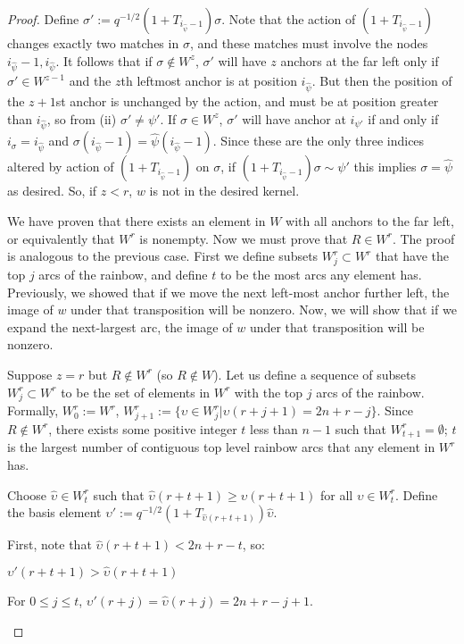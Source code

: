 \documentclass{amsart}
\begin{document}
\begin{proof}
	Define $\sigma':=q^{-1/2}(1+T_{i_{\widehat{\psi}}-1})\sigma$. Note that the action of $(1+T_{i_{\widehat{\psi}}-1})$ changes exactly two matches in $\sigma$, and these matches must involve the nodes $i_{\widehat{\psi}}-1,i_{\widehat{\psi}}$. It follows that if $\sigma\not\in W^z$, $\sigma'$ will have $z$ anchors at the far left only if $\sigma'\in W^{z-1}$ and the $z$th leftmost anchor is at position $i_{\widehat{\psi}}$. But then the position of the $z+1$st anchor is unchanged by the action, and must be at position greater than $i_{\widehat{\psi}}$, so from (ii) $\sigma'\not=\psi'$. If $\sigma\in W^z$, $\sigma'$ will have anchor at $i_{\psi'}$ if and only if $i_\sigma=i_{\widehat{\psi}}$ and $\sigma(i_{\widehat{\psi}}-1)=\widehat{\psi}(i_{\widehat{\psi}}-1)$. Since these are the only three indices altered by action of $(1+T_{i_{\widehat{\psi}}-1})$ on $\sigma$, if $(1+T_{i_{\widehat{\psi}}-1})\sigma\sim \psi'$ this implies $\sigma=\widehat{\psi}$ as desired. So, if $z<r$, $w$ is not in the desired kernel.
	
	\vspace{2mm}
	We have proven that there exists an element in $W$ with all anchors to the far left, or equivalently that $W^r$ is nonempty. Now we must prove that $R\in W^r$. The proof is analogous to the previous case. First we define subsets $W^r_j\subset W^r$ that have the top $j$ arcs of the rainbow, and define $t$ to be the most arcs any element has. Previously, we showed that if we move the next left-most anchor further left, the image of $w$ under that transposition will be nonzero. Now, we will show that if we expand the next-largest arc, the image of $w$ under that transposition will be nonzero.
	
	\vspace{2mm}
	Suppose $z=r$ but $R\not\in W^r$ (so $R\not\in W$). Let us define a sequence of subsets $W^r_j\subset W^r$ to be the set of elements in $W^r$ with the top $j$ arcs of the rainbow. Formally, $W^r_0:=W^r$, $W^r_{j+1}:=\{\upsilon\in W^r_j| \upsilon(r+j+1)=2n+r-j \}$. Since $R\not\in W^r$,  there exists some positive integer $t$ less than $n-1$ such that $W^r_{t+1}=\emptyset$; $t$ is the largest number of contiguous top level rainbow arcs that any element in $W^r$ has. 
	
	
	Choose $\widehat{\upsilon}\in W^r_t$ such that $\widehat{\upsilon}(r+t+1)\geq \upsilon(r+t+1)$ for all $\upsilon\in W^r_t$. Define the basis element $\upsilon':=q^{-1/2}(1+T_{\widehat{\upsilon}(r+t+1)})\widehat{\upsilon}$. 
	
	First, note that $\widehat{\upsilon}(r+t+1)<2n+r-t$, so:
	\begin{enumerate}[label={[\roman*]}]
		\item $\upsilon'(r+t+1)>\widehat{\upsilon}(r+t+1)$ 
		\item For $0\leq j\leq t$, $\upsilon'(r+j)=\widehat{\upsilon}(r+j)=2n+r-j+1$.
	\end{enumerate}
	

\end{proof}
\end{document}
